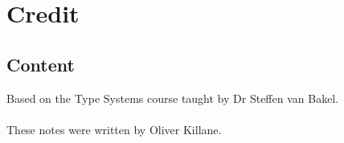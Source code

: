 \chapter{Credit}

\section*{Content}
Based on the Type Systems course taught by Dr Steffen van Bakel.
\\
\\ These notes were written by Oliver Killane.